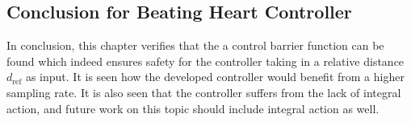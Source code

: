 \subsection{Conclusion for Beating Heart Controller}
In conclusion, this chapter verifies that the a control barrier function can be found which indeed ensures safety for the controller taking in a relative distance $d_\text{ref}$ as input. It is seen how the developed controller would benefit from a higher sampling rate. It is also seen that the controller suffers from the lack of integral action, and future work on this topic should include integral action as well.

